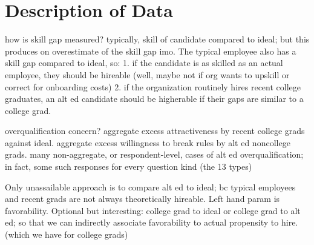 \documentclass[review]{elsarticle}
\begin{document}
\section{Description of Data}


how is skill gap measured? typically, skill of candidate compared to ideal; but this produces on overestimate of the skill gap imo.
The typical employee also has a skill gap compared to ideal, so:
1. if the candidate is as skilled as an actual employee, they should be hireable (well, maybe not if org wants to upskill or correct for onboarding costs)
2. if the organization routinely hires recent college graduates, an alt ed candidate should be higherable if their gaps are similar to a college grad.

overqualification concern?
aggregate excess attractiveness by recent college grads against ideal.
aggregate excess willingness to break rules by alt ed noncollege grads.
many non-aggregate, or respondent-level, cases of alt ed overqualification; in fact, some such responses for every question kind (the 13 types)

Only unassailable approach is to compare alt ed to ideal; bc typical employees and recent grads are not always theoretically hireable.
Left hand param is favorability.
Optional but interesting: college grad to ideal or college grad to alt ed; so that we can indirectly associate favorability to actual propensity to hire. (which we have for college grads)


\end{document}
